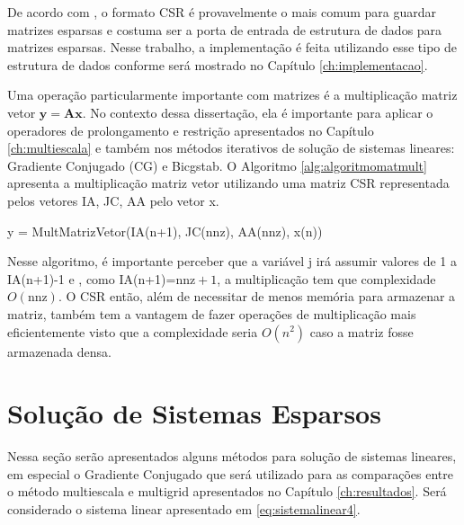 De acordo com \citet{solverlinear}, o formato CSR é provavelmente o mais comum para guardar matrizes esparsas e costuma ser a porta de entrada de estrutura de dados para matrizes esparsas. Nesse trabalho, a implementação é feita utilizando esse tipo de estrutura de dados conforme será mostrado no Capítulo \ref{ch:implementacao}.

Uma operação particularmente importante com matrizes é a multiplicação matriz vetor $\mathbf{y} = \mathbf{A}\mathbf{x}$. No contexto dessa dissertação, ela é importante para aplicar o operadores de prolongamento e restrição apresentados no Capítulo \ref{ch:multiescala} e também nos métodos iterativos de solução de sistemas lineares: Gradiente Conjugado (CG) e Bicgstab. O Algoritmo \ref{alg:algoritmomatmult} apresenta a multiplicação matriz vetor utilizando uma matriz CSR representada pelos vetores IA, JC, AA pelo vetor x.


\vspace{1cm}
\begin{algorithm}[H]
\caption{y = MultMatrizVetor(IA(n+1), JC(nnz), AA(nnz), x(n))}
\label{alg:algoritmomatmult}

\end{algorithm}
\vspace{1cm}


Nesse algoritmo, é importante perceber que a variável j irá assumir valores de 1 a IA(n+1)-1 e , como IA(n+1)=$\text{nnz} + 1$, a multiplicação tem que complexidade $O(\text{nnz})$. O CSR então, além de necessitar de menos memória para armazenar a matriz, também tem a vantagem de fazer operações de multiplicação mais eficientemente visto que a complexidade seria $O(n^2)$ caso a matriz fosse armazenada densa.


\section{Solução de Sistemas Esparsos} \label{sec:cg}

Nessa seção serão apresentados alguns métodos para solução de sistemas lineares, em especial o Gradiente Conjugado que será utilizado para as comparações entre o método multiescala e multigrid apresentados no Capítulo \ref{ch:resultados}. Será considerado o sistema linear apresentado em \eqref{eq:sistemalinear4}.

